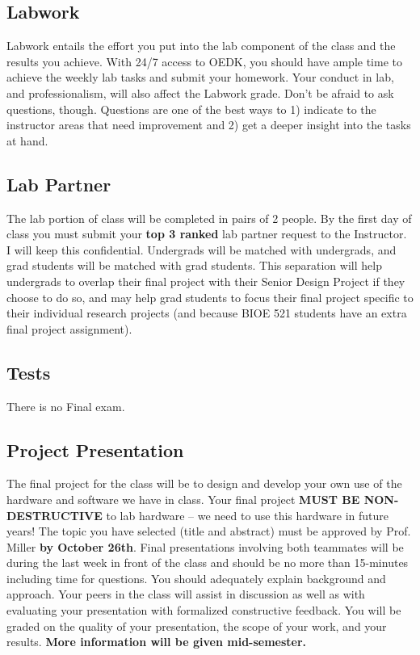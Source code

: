 \documentclass[10pt]{article}
\begin{document}
\subsection*{Labwork}
Labwork entails the effort you put into the lab component of the class and the results you achieve. With 24/7 access to OEDK, you should have ample time to achieve the weekly lab tasks and submit your homework. Your conduct in lab, and professionalism, will also affect the Labwork grade. Don't be afraid to ask questions, though. Questions are one of the best ways to 1) indicate to the instructor areas that need improvement and 2) get a deeper insight into the tasks at hand.

\subsection*{Lab Partner}
The lab portion of class will be completed in pairs of 2 people. By the first day of class you must submit your \textbf{top 3 ranked} lab partner request to the Instructor. I will keep this confidential. Undergrads will be matched with undergrads, and grad students will be matched with grad students. This separation will help undergrads to overlap their final project with their Senior Design Project if they choose to do so, and may help grad students to focus their final project specific to their individual research projects (and because BIOE 521 students have an extra final project assignment).

\subsection*{Tests}
There is no Final exam.

\subsection*{Project Presentation}
The final project for the class will be to design and develop your own use of the hardware and software we have in class. Your final project \textbf{MUST BE NON-DESTRUCTIVE} to lab hardware -- we need to use this hardware in future years! The topic you have selected (title and abstract) must be approved by Prof. Miller \textbf{by October 26th}. Final presentations involving both teammates will be during the last week in front of the class and should be no more than 15-minutes including time for questions. You should adequately explain background and approach. Your peers in the class will assist in discussion as well as with evaluating your presentation with formalized constructive feedback. You will be graded on the quality of your presentation, the scope of your work, and your results. \textbf{More information will be given mid-semester.} 
\end{document}
